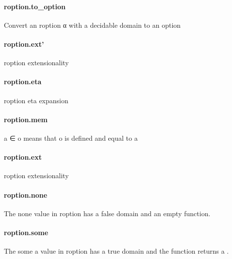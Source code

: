 \documentclass{article}
\begin{document}
\paragraph{roption.to\_option}
\par
Convert an 
\colorbox[RGB]{253,246,227}{{{{\color[RGB]{101, 123, 131} roption α }}}} with a decidable domain to an option
\paragraph{roption.ext'}
\par
\colorbox[RGB]{253,246,227}{{{{\color[RGB]{101, 123, 131} roption }}}} extensionality
\paragraph{roption.eta}
\par
\colorbox[RGB]{253,246,227}{{{{\color[RGB]{101, 123, 131} roption }}}} eta expansion
\paragraph{roption.mem}
\par
\colorbox[RGB]{253,246,227}{{{{\color[RGB]{101, 123, 131} a ∈ o }}}} means that 
\colorbox[RGB]{253,246,227}{{{{\color[RGB]{101, 123, 131} o }}}} is defined and equal to 
\colorbox[RGB]{253,246,227}{{{{\color[RGB]{101, 123, 131} a }}}}\paragraph{roption.ext}
\par
\colorbox[RGB]{253,246,227}{{{{\color[RGB]{101, 123, 131} roption }}}} extensionality
\paragraph{roption.none}
\par
The 
\colorbox[RGB]{253,246,227}{{{{\color[RGB]{101, 123, 131} none }}}} value in 
\colorbox[RGB]{253,246,227}{{{{\color[RGB]{101, 123, 131} roption }}}} has a 
\colorbox[RGB]{253,246,227}{{{{\color[RGB]{101, 123, 131} false }}}} domain and an empty function.
\paragraph{roption.some}
\par
The 
\colorbox[RGB]{253,246,227}{{{{\color[RGB]{101, 123, 131} some a }}}} value in 
\colorbox[RGB]{253,246,227}{{{{\color[RGB]{101, 123, 131} roption }}}} has a 
\colorbox[RGB]{253,246,227}{{{{\color[RGB]{101, 123, 131} true }}}} domain and the
function returns 
\colorbox[RGB]{253,246,227}{{{{\color[RGB]{101, 123, 131} a }}}}.
\end{document}
